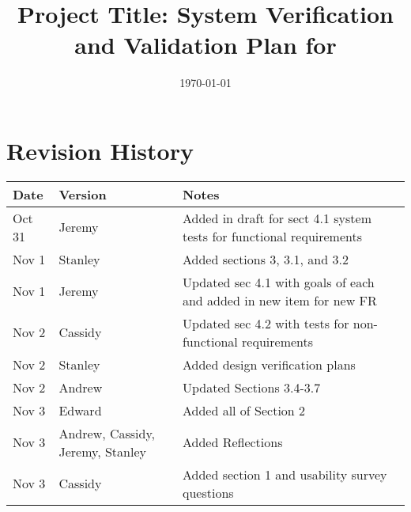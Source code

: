 \documentclass[12pt, titlepage]{article}
\begin{document}
\title{Project Title: System Verification and Validation Plan for \progname{}} 
\author{\authname}
\date{\today}
	
\maketitle


\section*{Revision History}

\begin{tabularx}{\textwidth}{p{3cm}p{2cm}X}
\toprule {\bf Date} & {\bf Version} & {\bf Notes}\\
\midrule
Oct 31 & Jeremy & Added in draft for sect 4.1 system tests for functional requirements \\ 
Nov 1 & Stanley & Added sections 3, 3.1, and 3.2 \\
Nov 1 & Jeremy & Updated sec 4.1 with goals of each and added in new item for new FR \\
Nov 2 & Cassidy & Updated sec 4.2 with tests for non-functional requirements \\
Nov 2 & Stanley & Added design verification plans \\
Nov 2 & Andrew & Updated Sections 3.4-3.7\\
Nov 3 & Edward & Added all of Section 2\\
Nov 3 & Andrew, Cassidy, Jeremy, Stanley & Added Reflections\\
Nov 3 & Cassidy & Added section 1 and usability survey questions \\
\bottomrule
\end{tabularx}

%
\end{document}
